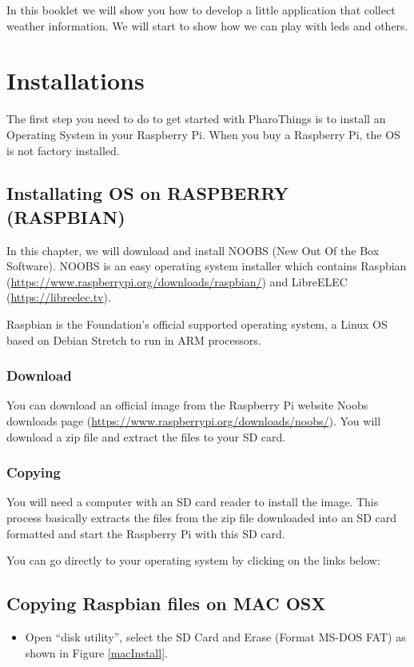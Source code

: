 \documentclass[10pt,twoside,english]{_support/latex/sbabook/sbabook}
\begin{document}
\frontmatter
\pagestyle{plain}

\tableofcontents*
\clearpage\listoffigures

\mainmatter


In this booklet we will show you how to develop a little application that collect weather information. 
We will start to show how we can play with leds and others. 
\chapter{Installations }
The first step you need to do to get started with PharoThings is to install an Operating System in your Raspberry Pi. When you buy a Raspberry Pi, the OS is not factory installed.
\section{Installating OS on RASPBERRY (RASPBIAN)}
In this chapter, we will download and install NOOBS (New Out Of the Box Software). NOOBS is an easy operating system installer which contains Raspbian (\url{https://www.raspberrypi.org/downloads/raspbian/}) and LibreELEC (\url{https://libreelec.tv}).

Raspbian is the Foundation’s official supported operating system, a Linux OS based on Debian Stretch to run in ARM processors.
\subsection{Download}
You can download an official image from the Raspberry Pi website Noobs downloads page (\url{https://www.raspberrypi.org/downloads/noobs/}). You will download a zip file and extract the files to your SD card.
\subsection{Copying}
You will need a computer with an SD card reader to install the image.
This process basically extracts the files from the zip file downloaded into an SD card formatted and start the Raspberry Pi with this SD card.

You can go directly to your operating system by clicking on the links below:
\section{Copying Raspbian files on MAC OSX}
\begin{itemize}
\item Open “disk utility”, select the SD Card and Erase (Format MS-DOS FAT) as shown in Figure \ref{macInstall}.
\end{itemize}
\end{document}
